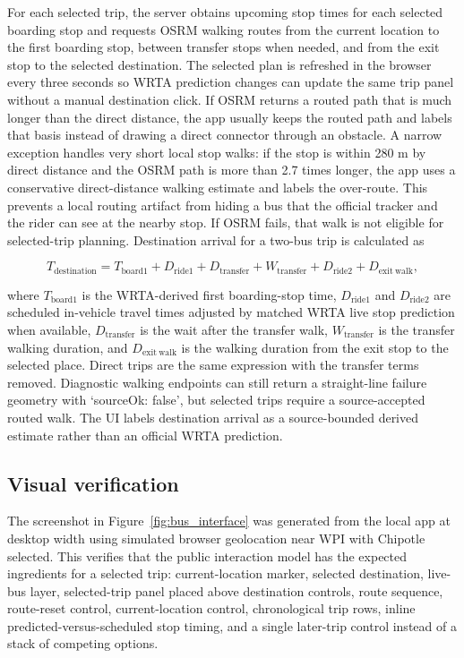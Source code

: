 \documentclass[12pt,letterpaper]{article}
\begin{document}
For each selected trip, the server obtains upcoming stop times for each selected boarding stop and requests OSRM walking routes from the current location to the first boarding stop, between transfer stops when needed, and from the exit stop to the selected destination. The selected plan is refreshed in the browser every three seconds so WRTA prediction changes can update the same trip panel without a manual destination click. If OSRM returns a routed path that is much longer than the direct distance, the app usually keeps the routed path and labels that basis instead of drawing a direct connector through an obstacle. A narrow exception handles very short local stop walks: if the stop is within 280 m by direct distance and the OSRM path is more than 2.7 times longer, the app uses a conservative direct-distance walking estimate and labels the over-route. This prevents a local routing artifact from hiding a bus that the official tracker and the rider can see at the nearby stop. If OSRM fails, that walk is not eligible for selected-trip planning. Destination arrival for a two-bus trip is calculated as

\[
T_{\mathrm{destination}} = T_{\mathrm{board1}} + D_{\mathrm{ride1}} + D_{\mathrm{transfer}} + W_{\mathrm{transfer}} + D_{\mathrm{ride2}} + D_{\mathrm{exit\ walk}},
\]

where \(T_{\mathrm{board1}}\) is the WRTA-derived first boarding-stop time, \(D_{\mathrm{ride1}}\) and \(D_{\mathrm{ride2}}\) are scheduled in-vehicle travel times adjusted by matched WRTA live stop prediction when available, \(D_{\mathrm{transfer}}\) is the wait after the transfer walk, \(W_{\mathrm{transfer}}\) is the transfer walking duration, and \(D_{\mathrm{exit\ walk}}\) is the walking duration from the exit stop to the selected place. Direct trips are the same expression with the transfer terms removed. Diagnostic walking endpoints can still return a straight-line failure geometry with `sourceOk: false', but selected trips require a source-accepted routed walk. The UI labels destination arrival as a source-bounded derived estimate rather than an official WRTA prediction.

\subsection{Visual verification}

The screenshot in Figure~\ref{fig:bus_interface} was generated from the local app at desktop width using simulated browser geolocation near WPI with Chipotle selected. This verifies that the public interaction model has the expected ingredients for a selected trip: current-location marker, selected destination, live-bus layer, selected-trip panel placed above destination controls, route sequence, route-reset control, current-location control, chronological trip rows, inline predicted-versus-scheduled stop timing, and a single later-trip control instead of a stack of competing options.
\end{document}
